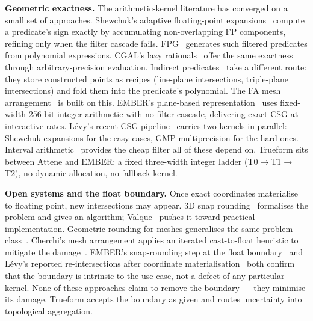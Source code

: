 \documentclass{egpubl}
\begin{document}
\textbf{Geometric exactness.} The arithmetic-kernel literature has converged on a small set of approaches. Shewchuk's adaptive floating-point expansions~\cite{Shewchuk1997} compute a predicate's sign exactly by accumulating non-overlapping FP components, refining only when the filter cascade fails. FPG~\cite{MeyerPion2008} generates such filtered predicates from polynomial expressions. CGAL's lazy rationals~\cite{CGAL2023} offer the same exactness through arbitrary-precision evaluation. Indirect predicates~\cite{Attene2020} take a different route: they store constructed points as recipes (line-plane intersections, triple-plane intersections) and fold them into the predicate's polynomial. The FA mesh arrangement~\cite{Cherchi2020} is built on this. EMBER's plane-based representation~\cite{Trettner2022,NehringWirxel2021} uses fixed-width 256-bit integer arithmetic with no filter cascade, delivering exact CSG at interactive rates. L\'evy's recent CSG pipeline~\cite{Levy2025} carries two kernels in parallel: Shewchuk expansions for the easy cases, GMP multiprecision for the hard ones. Interval arithmetic~\cite{Bronnimann1998} provides the cheap filter all of these depend on. Trueform sits between Attene and EMBER: a fixed three-width integer ladder (T0$\to$T1$\to$T2), no dynamic allocation, no fallback kernel.

\textbf{Open systems and the float boundary.} Once exact coordinates materialise to floating point, new intersections may appear. 3D snap rounding~\cite{DevillersLazardLenhart2018} formalises the problem and gives an algorithm; Valque~\cite{Valque2019} pushes it toward practical implementation. Geometric rounding for meshes generalises the same problem class~\cite{MilenkovicSacks2019}. Cherchi's mesh arrangement applies an iterated cast-to-float heuristic to mitigate the damage~\cite{Cherchi2020}. EMBER's snap-rounding step at the float boundary~\cite{Trettner2022} and L\'evy's reported re-intersections after coordinate materialisation~\cite{Levy2025} both confirm that the boundary is intrinsic to the use case, not a defect of any particular kernel. None of these approaches claim to remove the boundary --- they minimise its damage. Trueform accepts the boundary as given and routes uncertainty into topological aggregation.
\end{document}
